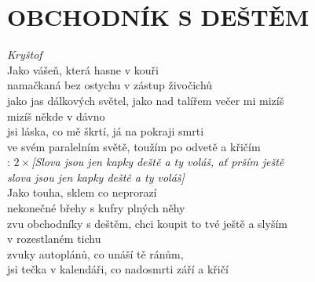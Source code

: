 \section*{\Huge OBCHODNÍK S DEŠTĚM}
\emph{Kryštof}\\


Jako vášeň, která hasne v kouři\\
namačkaná bez ostychu v zástup živočichů\\
jako jas dálkových světel, jako nad talířem večer mi mizíš\\
mizíš někde v dávno\\
jsi láska, co mě škrtí, já na pokraji smrti\\
ve svém paralelním světě, toužím po odvetě a křičím\\

\textregistered: $2\times$\emph{[Slova jsou jen kapky deště a ty voláš, ať prším ještě\\
slova jsou jen kapky deště a ty voláš]}\\

Jako touha, sklem co neprorazí\\
nekonečné břehy s kufry plných něhy\\
zvu obchodníky s deštěm, chci koupit to tvé ještě a slyším\\
v rozestlaném tichu\\
zvuky autoplánů, co unáší tě ránům,\\
jsi tečka v kalendáři, co nadosmrti září a křičí\\

\textregistered

\newpage
